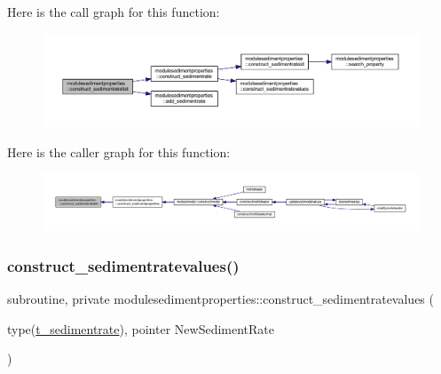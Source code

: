 Here is the call graph for this function\+:\nopagebreak
\begin{figure}[H]
\begin{center}
\leavevmode
\includegraphics[width=350pt]{namespacemodulesedimentproperties_ac8e0d26b714ef94bff3a38a7730ee2a5_cgraph}
\end{center}
\end{figure}
Here is the caller graph for this function\+:\nopagebreak
\begin{figure}[H]
\begin{center}
\leavevmode
\includegraphics[width=350pt]{namespacemodulesedimentproperties_ac8e0d26b714ef94bff3a38a7730ee2a5_icgraph}
\end{center}
\end{figure}
\mbox{\label{namespacemodulesedimentproperties_a6a52cd2ecac4c72aa40426e7ed1e0616}} 
\subsubsection{\texorpdfstring{construct\+\_\+sedimentratevalues()}{construct\_sedimentratevalues()}}
{\footnotesize\ttfamily subroutine, private modulesedimentproperties\+::construct\+\_\+sedimentratevalues (\begin{DoxyParamCaption}\item[{type(\mbox{\hyperlink{structmodulesedimentproperties_1_1t__sedimentrate}{t\+\_\+sedimentrate}}), pointer}]{New\+Sediment\+Rate }\end{DoxyParamCaption})\hspace{0.3cm}{\ttfamily [private]}}

